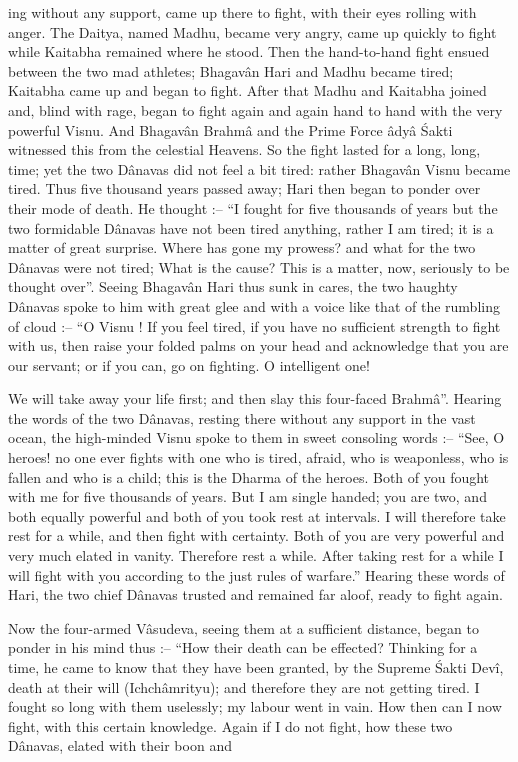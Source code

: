 ing without any support, came up there to fight, with their eyes rolling with anger. The Daitya, named Madhu, became very angry, came up quickly to fight while Kaitabha remained where he stood. Then the hand-to-hand fight ensued between the  two mad athletes; Bhagav\^an Hari and Madhu became tired; Kaitabha came up and began to fight. After that Madhu and Kaitabha joined and, blind with rage, began to fight again and again hand to hand with the very powerful Visnu. And Bhagav\^an Brahm\^a and the Prime Force \^ady\^a \'Sakti witnessed this from the celestial Heavens. So the fight lasted for a long, long, time; yet the two D\^anavas did not feel a bit tired: rather Bhagav\^an Visnu became tired. Thus five thousand years passed away; Hari then began to ponder over their mode of death. He thought :-- ``I fought for five thousands of years but the two formidable D\^anavas have not been tired anything, rather I am tired; it is a matter of great surprise. Where has gone my prowess? and what for the two D\^anavas were not tired; What is the cause? This is a matter, now, seriously to be thought over''. Seeing Bhagav\^an Hari thus sunk in cares, the two haughty D\^anavas spoke to him with great glee and with a voice like that of the rumbling of cloud :-- ``O Visnu ! If you feel tired, if you have no sufficient strength to fight with us, then raise your folded palms on your head and acknowledge that you are our servant; or if you can, go on fighting. O intelligent one!

We will take away your life first; and then slay this four-faced Brahm\^a''. Hearing the words of the two D\^anavas, resting there without any support in the vast ocean, the high-minded Visnu spoke to them in sweet consoling words :-- ``See, O heroes! no one ever fights with one who is tired, afraid, who is weaponless, who is fallen and who is a child; this is the Dharma of the heroes. Both of you fought with me for five thousands of years. But I am single handed; you are two, and both equally powerful and both of you took rest at intervals. I will therefore take rest for a while, and then fight with certainty. Both of you are very powerful and very much elated in vanity. Therefore rest a while. After taking rest for a while I will fight with you according to the just rules of warfare.'' Hearing these words of Hari, the two chief D\^anavas trusted and remained far aloof, ready to fight again.

Now the four-armed V\^asudeva, seeing them at a sufficient distance, began to ponder in his mind thus :-- ``How their death can be effected? Thinking for a time, he came to know that they have been granted, by the Supreme \'Sakti Dev\^i, death at their will (Ichch\^amrityu); and therefore they are not getting tired. I fought so long with them uselessly; my labour went in vain. How then can I now fight, with this certain knowledge. Again if I do not fight, how these two D\^anavas, elated with their boon and


